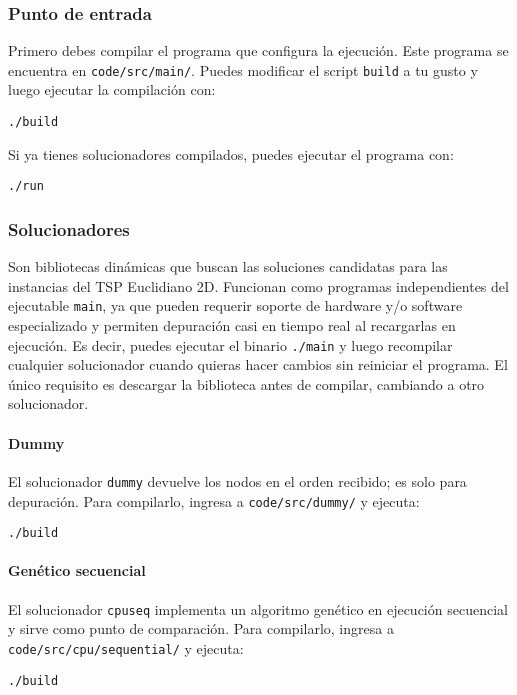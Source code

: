 \documentclass[main.tex]{subfiles}
\begin{document}
\begin{mdframed}[linewidth=2pt]
\subsubsection*{Punto de entrada}
Primero debes compilar el programa que configura la ejecución. Este programa se encuentra en \texttt{code/src/main/}.  
Puedes modificar el script \texttt{build} a tu gusto y luego ejecutar la compilación con:
\begin{verbatim}
./build
\end{verbatim}
Si ya tienes solucionadores compilados, puedes ejecutar el programa con:
\begin{verbatim}
./run
\end{verbatim}

\subsubsection*{Solucionadores}
Son bibliotecas dinámicas que buscan las soluciones candidatas para las instancias del TSP Euclidiano 2D. Funcionan como programas independientes del ejecutable \texttt{main}, ya que pueden requerir soporte de hardware y/o software especializado y permiten depuración casi en tiempo real al recargarlas en ejecución.  
Es decir, puedes ejecutar el binario \texttt{./main} y luego recompilar cualquier solucionador cuando quieras hacer cambios sin reiniciar el programa. El único requisito es descargar la biblioteca antes de compilar, cambiando a otro solucionador.

\paragraph{Dummy}
El solucionador \texttt{dummy} devuelve los nodos en el orden recibido; es solo para depuración.  
Para compilarlo, ingresa a \texttt{code/src/dummy/} y ejecuta:
\begin{verbatim}
./build
\end{verbatim}

\paragraph{Genético secuencial}
El solucionador \texttt{cpuseq} implementa un algoritmo genético en ejecución secuencial y sirve como punto de comparación.  
Para compilarlo, ingresa a \texttt{code/src/cpu/sequential/} y ejecuta:
\begin{verbatim}
./build
\end{verbatim}


\end{mdframed}
\end{document}
